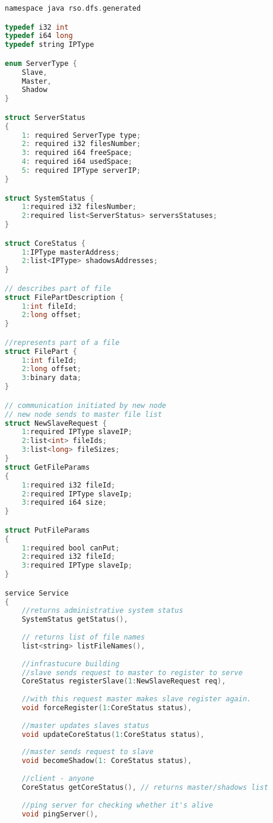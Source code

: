 \begin{lstlisting}[language=C,style=incode,
morekeywords={exception,typedef,i32,i64,namespace,enum,required,struct,bool}]
namespace java rso.dfs.generated

typedef i32 int
typedef i64 long
typedef string IPType

enum ServerType {
	Slave,
	Master,
	Shadow
}

struct ServerStatus
{
	1: required ServerType type;
	2: required i32 filesNumber;
	3: required i64 freeSpace;
	4: required i64 usedSpace;
	5: required IPType serverIP;
}

struct SystemStatus {
	1:required i32 filesNumber;
	2:required list<ServerStatus> serversStatuses;
}

struct CoreStatus {
	1:IPType masterAddress;
	2:list<IPType> shadowsAddresses;
}

// describes part of file
struct FilePartDescription {
	1:int fileId;
	2:long offset;
}

//represents part of a file
struct FilePart {
	1:int fileId;
	2:long offset;
	3:binary data;
}

// communication initiated by new node
// new node sends to master file list
struct NewSlaveRequest {
	1:required IPType slaveIP;
	2:list<int> fileIds;
	3:list<long> fileSizes;
}
struct GetFileParams
{
	1:required i32 fileId;
	2:required IPType slaveIp;
	3:required i64 size;
}

struct PutFileParams
{
	1:required bool canPut;
	2:required i32 fileId;
	3:required IPType slaveIp;
}

service Service
{
	//returns administrative system status
	SystemStatus getStatus(),
	
	// returns list of file names 
	list<string> listFileNames(),
	
	//infrastucure building
	//slave sends request to master to register to serve
	CoreStatus registerSlave(1:NewSlaveRequest req),
	
	//with this request master makes slave register again.
	void forceRegister(1:CoreStatus status),
	
	//master updates slaves status
	void updateCoreStatus(1:CoreStatus status),
	
	//master sends request to slave
	void becomeShadow(1: CoreStatus status),
	
	//client - anyone
	CoreStatus getCoreStatus(), // returns master/shadows list
	
	//ping server for checking whether it's alive
	void pingServer(),
	

\end{lstlisting}
